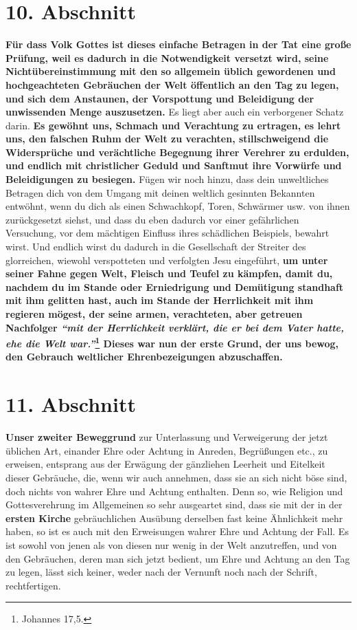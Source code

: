 \section{10. Abschnitt} \label{kap9_ab10}

\label{ref:09_10_spott} \textbf{Für dass Volk Gottes ist dieses einfache
Betragen in der Tat
eine große
Prüfung,
weil es dadurch in die Notwendigkeit versetzt wird, seine Nichtübereinstimmung
mit den so allgemein üblich gewordenen und hochgeachteten Gebräuchen der Welt
öffentlich an den Tag zu legen, und sich dem Anstaunen, der Vorspottung und
Beleidigung der unwissenden Menge auszusetzen.} Es liegt aber auch ein
verborgener Schatz darin. \textbf{Es gewöhnt uns, Schmach und Verachtung zu
ertragen,
es lehrt uns, den falschen Ruhm der Welt zu verachten,
stillschweigend die
Widersprüche und verächtliche Begegnung ihrer Verehrer zu erdulden, und endlich
mit christlicher Geduld und Sanftmut ihre Vorwürfe und Beleidigungen zu
besiegen.} Fügen wir noch hinzu, dass dein unweltliches Betragen dich von dem
Umgang mit deinen weltlich gesinnten Bekannten entwöhnt, wenn
du dich als einen
Schwachkopf, Toren, Schwärmer usw. von ihnen zurückgesetzt siehst, und dass
du eben dadurch vor einer gefährlichen Versuchung, vor dem mächtigen Einfluss
ihres schädlichen Beispiels, bewahrt wirst. Und endlich wirst du dadurch in
die Gesellschaft der Streiter des glorreichen, wiewohl verspotteten und
verfolgten Jesu eingeführt, \textbf{um unter seiner Fahne
gegen Welt, Fleisch und Teufel
zu kämpfen, damit du, nachdem du im Stande oder Erniedrigung und Demütigung
standhaft mit ihm gelitten hast, auch im Stande der Herrlichkeit mit ihm
regieren mögest, der seine armen, verachteten, aber getreuen Nachfolger
\textit{"`mit der Herrlichkeit verklärt, die er bei dem Vater hatte, ehe die
Welt
war."'}\footnote{Johannes 17,5.}
Dieses war nun der erste Grund, der uns bewog, den
Gebrauch weltlicher Ehrenbezeigungen abzuschaffen.}

\section{11. Abschnitt} \label{kap9_ab11}

\textbf{Unser zweiter Beweggrund} zur Unterlassung und Verweigerung der jetzt
üblichen
Art, einander Ehre oder Achtung in Anreden, Begrüßungen etc., zu erweisen,
entsprang aus der Erwägung der gänzliehen Leerheit und Eitelkeit dieser
Gebräuche, die, wenn wir auch annehmen, dass sie an sich nicht böse sind, doch
nichts von wahrer Ehre und Achtung enthalten. Denn so, wie Religion und
Gottesverehrung im Allgemeinen so sehr ausgeartet sind, dass sie mit der in der
\textbf{ersten Kirche} gebräuchlichen Ausübung derselben
fast keine Ähnlichkeit mehr
haben, so ist es auch mit den Erweisungen wahrer Ehre und Achtung der Fall. Es
ist sowohl von jenen als von diesen nur wenig in der Welt anzutreffen, und von
den Gebräuchen, deren man sich jetzt bedient, um Ehre und Achtung an den Tag zu
legen, lässt sich keiner, weder nach der Vernunft noch nach der Schrift,
rechtfertigen.

